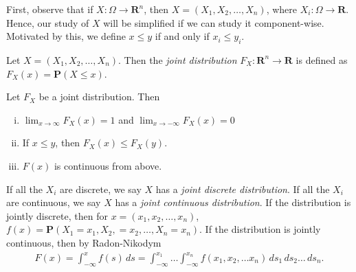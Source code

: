 First, observe that if ${X}: \Omega \to \mathbf{R}^n$, then $X = (X_1, X_2,
\ldots, X_n)$, where $X_i: \Omega \to \mathbf{R}$. Hence, our study of $X$ will be
simplified if we can study it component-wise. Motivated by this, we define
$x \le y$ if and only if $x_i \le y_i$. 
\begin{definition}
	Let ${X} = (X_1, X_2, \ldots, X_n)$. Then the \emph{joint distribution}
	$F_X: \mathbf{R}^n \to \mathbf{R}$
	is defined as $F_X(x) = \mathbf{P}({X} \le x)$.
	\begin{lemma}
		Let $F_X$ be a joint distribution. Then
		\begin{enumerate}[(i)]
			\item
				$\lim_{x \to \infty} F_X(x) = 1$ and $\lim_{x \to -\infty}
				F_X(x) = 0$
			\item
				If $x \le y$, then $F_X(x) \le F_X(y)$.
			\item
				$F(x)$ is continuous from above.
		\end{enumerate}
	\end{lemma}
	If all the $X_i$ are discrete, we say $X$ has a \emph{joint discrete
	distribution}. If all the $X_i$ are continuous, we say $X$ has a 
	\emph{joint continuous distribution}. If the distribution is jointly 
	discrete,
	then for $x = (x_1, x_2, \ldots, x_n)$,
	$f(x) = \mathbf{P}(X_1 = x_1, X_2, = x_2,
	\ldots, X_n = x_n)$. If the distribution is jointly continuous, then by
	Radon-Nikodym
	\begin{align*}
		F(x) = \int_{-\infty}^x f(s) \, ds = \int_{-\infty}^{x_1} \ldots
		\int_{-\infty}^{x_n} f(x_1, x_2, \ldots x_n) \, ds_1 \, ds_2 \ldots \, 
		ds_n.
	\end{align*}


\end{definition}
